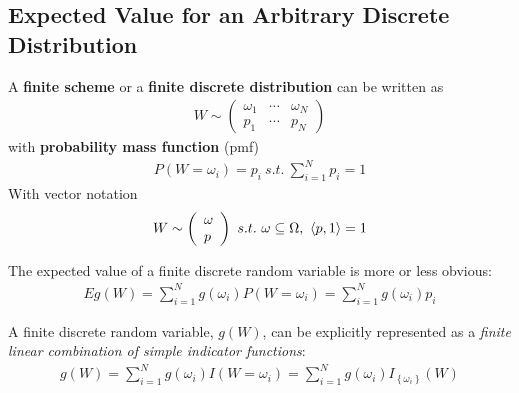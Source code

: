 \documentclass{article}
\begin{document}
	\subsection{Expected Value for an Arbitrary Discrete Distribution}
	\begin{definition}
		A \textbf{finite scheme} or a \textbf{finite discrete distribution} can be written as
		\begin{align}
			W \sim\left(\begin{array}{lll}{\omega_{1}} & {\cdots} & {\omega_{N}} \\ {p_{1}} & {\cdots} & {p_{N}}\end{array}\right)
		\end{align}
		with \textbf{probability mass function} (pmf)
		\begin{align}
			P\left(W=\omega_{i}\right)=p_{i}\ s.t.\ \sum_{i=1}^N p_i = 1
		\end{align}
		With vector notation
		\begin{align}
			W \sim\left(\begin{array}{l}{\omega} \\ p\end{array}\right)\ s.t.\ \omega \subseteq \Omega,\ \inner{p}{1} = 1
		\end{align}
	\end{definition}
	
	\begin{proposition}
		The expected value of a finite discrete random variable is more or less obvious:
		\begin{align}
			E g(W)=\sum_{i=1}^{N} g\left(\omega_{i}\right) P\left(W=\omega_{i}\right)=\sum_{i=1}^{N} g\left(\omega_{i}\right) p_{i}
		\end{align}
	\end{proposition}
	
	\begin{proposition}
		A finite discrete random variable, $g(W)$, can be explicitly represented as a \emph{finite linear combination of simple indicator functions}:
		\begin{align}
			g(W)=\sum_{i=1}^{N} g\left(\omega_{i}\right) I\left(W=\omega_{i}\right)=\sum_{i=1}^{N} g\left(\omega_{i}\right) I_{\left\{\omega_{i}\right\}}(W)
		\end{align}
	\end{proposition}
	
\end{document}
